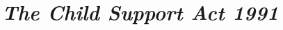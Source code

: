 \documentclass[12pt,a4paper]{article}
\begin{document}
%
%
%
%
%
%
%
%
%
%
%
%
%
%

\section*{\itshape The Child Support Act 1991}
\end{document}
